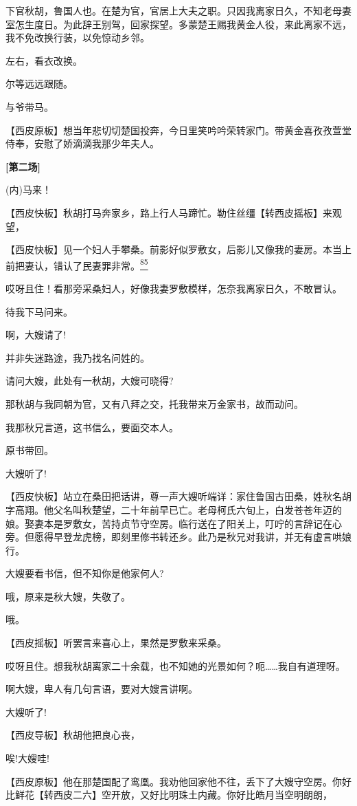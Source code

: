 下官秋胡，鲁国人也。在楚为官，官居上大夫之职。只因我离家日久，不知老母妻室怎生度日。为此辞王别驾，回家探望。多蒙楚王赐我黄金人役，来此离家不远，我不免改换行装，以免惊动乡邻。

左右，看衣改换。

尔等远远跟随。

与爷带马。

【西皮原板】想当年悲切切楚国投奔，今日里笑吟吟荣转家门。带黄金喜孜孜萱堂侍奉，安慰了娇滴滴我那少年夫人。

\textbf{{[}第二场{]}}

(内)马来！

【西皮快板】秋胡打马奔家乡，路上行人马蹄忙。勒住丝缰【转西皮摇板】来观望，

【西皮快板】见一个妇人手攀桑。前影好似罗敷女，后影儿又像我的妻房。本当上前把妻认，错认了民妻罪非常。\protect\hyperlink{fn85}{\textsuperscript{85}}

哎呀且住！看那旁采桑妇人，好像我妻罗敷模样，怎奈我离家日久，不敢冒认。

待我下马问来。

啊，大嫂请了!

并非失迷路途，我乃找名问姓的。

请问大嫂，此处有一秋胡，大嫂可晓得?

那秋胡与我同朝为官，又有八拜之交，托我带来万金家书，故而动问。

我那秋兄言道，这书信么，要面交本人。

原书带回。

大嫂听了!

【西皮快板】站立在桑田把话讲，尊一声大嫂听端详：家住鲁国古田桑，姓秋名胡字高翔。他父名叫秋楚望，二十年前早已亡。老母柯氏六旬上，白发苍苍年迈的娘。娶妻本是罗敷女，苦持贞节守空房。临行送在了阳关上，叮咛的言辞记在心旁。但愿得早登龙虎榜，即刻里修书转还乡。此乃是秋兄对我讲，并无有虚言哄娘行。

大嫂要看书信，但不知你是他家何人?

哦，原来是秋大嫂，失敬了。

哦。

【西皮摇板】听罢言来喜心上，果然是罗敷来采桑。

哎呀且住。想我秋胡离家二十余载，也不知她的光景如何？呃\ldots{}\ldots{}我自有道理呀。

啊大嫂，卑人有几句言语，要对大嫂言讲啊。

大嫂听了!

【西皮导板】秋胡他把良心丧，

唉!大嫂哇!

【西皮原板】他在那楚国配了鸾凰。我劝他回家他不往，丢下了大嫂守空房。你好比鲜花【转西皮二六】空开放，又好比明珠土内藏。你好比皓月当空明朗朗，

